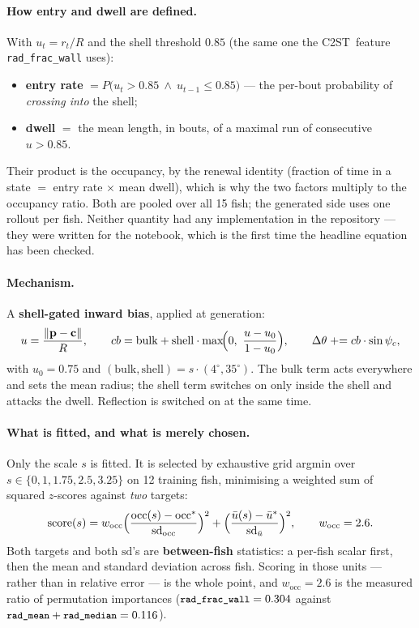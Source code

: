 \documentclass[11pt,a4paper]{article}
\newcommand{\dth}{\ensuremath{\Delta\theta}}
\newcommand{\ctst}{C2ST}
\newcommand{\code}[1]{\texttt{\small #1}}
\begin{document}
\paragraph{How entry and dwell are defined.} With $u_t = r_t/R$ and the shell threshold
$0.85$ (the same one the \ctst\ feature \code{rad\_frac\_wall} uses):
\begin{itemize}\itemsep1pt
\item \textbf{entry rate} $= P\bigl(u_t > 0.85 \ \wedge\ u_{t-1} \le 0.85\bigr)$ --- the
      per-bout probability of \emph{crossing into} the shell;
\item \textbf{dwell} $=$ the mean length, in bouts, of a maximal run of consecutive
      $u > 0.85$.
\end{itemize}
Their product is the occupancy, by the renewal identity (fraction of time in a state
$=$ entry rate $\times$ mean dwell), which is why the two factors multiply to the
occupancy ratio. Both are pooled over all 15 fish; the generated side uses one rollout per
fish. Neither quantity had any implementation in the repository --- they were written for
the notebook, which is the first time the headline equation has been checked.

\paragraph{Mechanism.} A \textbf{shell-gated inward bias}, applied at generation:
\begin{equation}
u = \frac{\lVert \mathbf{p} - \mathbf{c}\rVert}{R},\qquad
cb = \mathrm{bulk} + \mathrm{shell}\cdot\max\!\Bigl(0,\ \frac{u-u_0}{1-u_0}\Bigr),\qquad
\dth{} \mathrel{{+}{=}} cb\cdot\sin\psi_c ,
\end{equation}
with $u_0 = 0.75$ and $(\mathrm{bulk},\mathrm{shell}) = s\cdot(4^\circ, 35^\circ)$. The
bulk term acts everywhere and sets the mean radius; the shell term switches on only inside
the shell and attacks the dwell. Reflection is switched on at the same time.

\paragraph{What is fitted, and what is merely chosen.} Only the scale $s$ is fitted. It is
selected by exhaustive grid argmin over $s \in \{0, 1, 1.75, 2.5, 3.25\}$ on 12 training
fish, minimising a weighted sum of squared $z$-scores against \emph{two} targets:
\begin{equation}
\mathrm{score}(s) = w_{\mathrm{occ}}\Bigl(\frac{\mathrm{occ}(s)-\mathrm{occ}^{*}}{\mathrm{sd}_{\mathrm{occ}}}\Bigr)^{2}
 + \Bigl(\frac{\bar u(s)-\bar u^{*}}{\mathrm{sd}_{\bar u}}\Bigr)^{2},
 \qquad w_{\mathrm{occ}} = 2.6 .
\end{equation}
Both targets and both $\mathrm{sd}$'s are \textbf{between-fish} statistics: a per-fish
scalar first, then the mean and standard deviation across fish. Scoring in those units ---
rather than in relative error --- is the whole point, and $w_{\mathrm{occ}} = 2.6$ is the
measured ratio of permutation importances ($\code{rad\_frac\_wall} = 0.304$ against
$\code{rad\_mean}+\code{rad\_median} = 0.116$).
\end{document}
